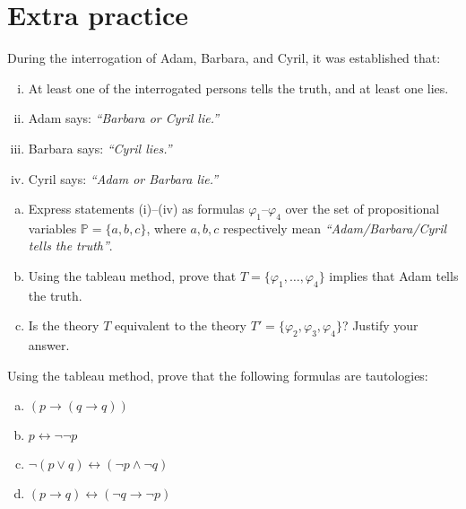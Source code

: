         
\section*{Extra practice}


\begin{problem}

    During the interrogation of Adam, Barbara, and Cyril, it was established that:
    \begin{enumerate}[(i)]\it
        \item At least one of the interrogated persons tells the truth, and at least one lies.
        \item Adam says: \emph{``Barbara or Cyril lie.''}
        \item Barbara says: \emph{``Cyril lies.''}
        \item Cyril says: \emph{``Adam or Barbara lie.''}
    \end{enumerate}
    \begin{enumerate}[(a)]
        \item Express statements (i)–(iv) as formulas $\varphi_1$–$\varphi_4$ over the set of propositional variables $\mathbb{P}=\{a,b,c\}$, where $a,b,c$ respectively mean {\it ``Adam/Barbara/Cyril tells the truth''}.
        \item Using the tableau method, prove that $T = \{\varphi_1, \dots, \varphi_4\}$ implies that Adam tells the truth.
        \item Is the theory $T$ equivalent to the theory $T' = \{\varphi_2, \varphi_3, \varphi_4\}$? Justify your answer.    
    \end{enumerate}
    
\end{problem}
        

\begin{problem}

    Using the tableau method, prove that the following formulas are tautologies:
    \begin{enumerate}[(a)]
        \item $(p\to (q \to q))$
        \item $p \leftrightarrow \neg \neg  p$
        \item $\neg (p \vee q) \leftrightarrow (\neg p \wedge \neg q)$
        \item $(p \to q) \leftrightarrow (\neg q \to \neg p)$    
    \end{enumerate}

\end{problem} 
   

